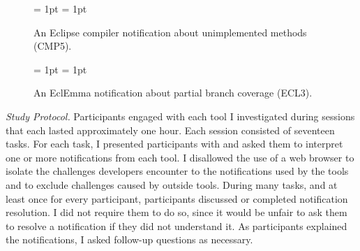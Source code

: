 \documentclass{llncs}
\begin{document}
\begin{figure} 
	\subfigcapskip = 1pt
	\centering
			\subfigcapskip = 1pt
					
					\caption{An Eclipse compiler notification about unimplemented methods (CMP5).}
					\label{fig:notificationCOMP} 
				\end{figure}

\begin{figure} 
	\subfigcapskip = 1pt
	\centering
			\subfigcapskip = 1pt
				
				\caption{An EclEmma notification about partial branch coverage (ECL3).}
				\label{fig:notificationECL}
			\end{figure} 

\vspace{0.5em}
\noindent\textit{Study Protocol.} 
Participants engaged with each tool I investigated during sessions that each lasted approximately one hour. Each session consisted of seventeen tasks. 
For each task, I presented participants with and asked them to interpret one or more notifications from each tool.
I disallowed the use of a web browser to isolate the challenges developers encounter to the notifications used by the tools and to exclude challenges caused by outside tools.
During many tasks, and at least once for every participant, participants discussed or completed notification resolution. I did not require them to do so, since it would be unfair to ask them to resolve a notification if they did not understand it.
As participants explained the notifications, I asked follow-up questions as necessary. 
\end{document}
